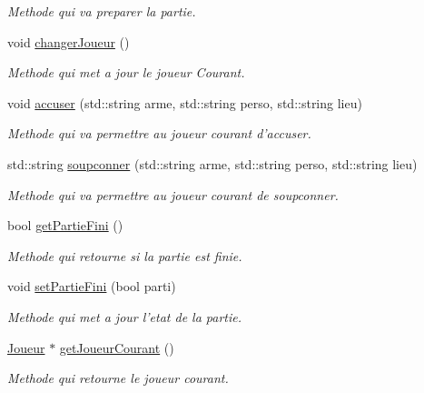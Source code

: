 \begin{DoxyCompactItemize}
\begin{DoxyCompactList}\small\item\em \-Methode qui va preparer la partie. \end{DoxyCompactList}\item 
void \hyperlink{classDonneesJeu_ae443a7d34f88fe863914746b6e1fefd9}{changer\-Joueur} ()
\begin{DoxyCompactList}\small\item\em \-Methode qui met a jour le joueur \-Courant. \end{DoxyCompactList}\item 
void \hyperlink{classDonneesJeu_a0329e6f5906aca754330ee17d7b4ab56}{accuser} (std\-::string arme, std\-::string perso, std\-::string lieu)
\begin{DoxyCompactList}\small\item\em \-Methode qui va permettre au joueur courant d'accuser. \end{DoxyCompactList}\item 
std\-::string \hyperlink{classDonneesJeu_a5db87f4ec8d3d5b790ec58b6b17931e1}{soupconner} (std\-::string arme, std\-::string perso, std\-::string lieu)
\begin{DoxyCompactList}\small\item\em \-Methode qui va permettre au joueur courant de soupconner. \end{DoxyCompactList}\item 
bool \hyperlink{classDonneesJeu_a7d47cf2b384712fd2aca3494fc5e23b8}{get\-Partie\-Fini} ()
\begin{DoxyCompactList}\small\item\em \-Methode qui retourne si la partie est finie. \end{DoxyCompactList}\item 
void \hyperlink{classDonneesJeu_a97ab9601b004cb1ffd4365db0f90e479}{set\-Partie\-Fini} (bool parti)
\begin{DoxyCompactList}\small\item\em \-Methode qui met a jour l'etat de la partie. \end{DoxyCompactList}\item 
\hyperlink{classJoueur}{\-Joueur} $\ast$ \hyperlink{classDonneesJeu_a5c71130d171fbd79f39f90d1ab96d82c}{get\-Joueur\-Courant} ()
\begin{DoxyCompactList}\small\item\em \-Methode qui retourne le joueur courant. \end{DoxyCompactList}\item 

\end{DoxyCompactItemize}
